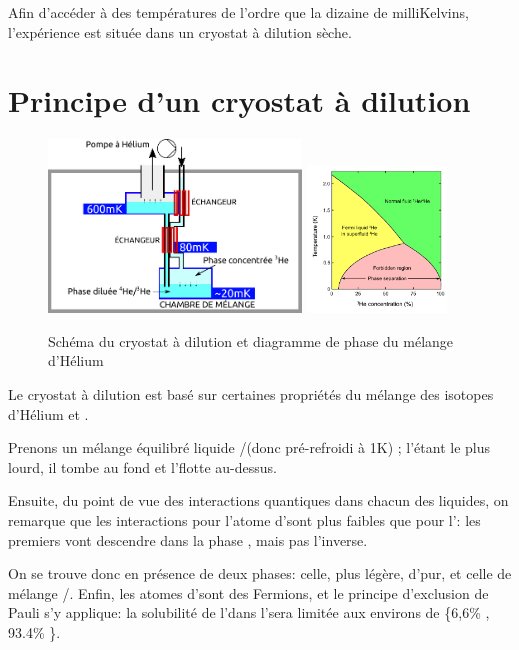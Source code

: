 Afin d'accéder à des températures de l'ordre que la dizaine de milliKelvins, l'expérience est située dans un cryostat à dilution sèche.
\section{Principe d'un cryostat à dilution}
\begin{figure}[h]
  \begin{center}
    \includegraphics[width=0.6\textwidth]{Images/Cryostat_Schema.pdf}
    \qquad
    \includegraphics[width=0.33\textwidth]{Images/Helium_phase_diagram.pdf}
    \caption{Schéma du cryostat à dilution et diagramme de phase du mélange d'Hélium}
  \end{center}
\end{figure}
Le cryostat à dilution est basé sur certaines propriétés du mélange des isotopes d'Hélium \HeT et \HeQ.
\newline

Prenons un mélange équilibré liquide \HeT/\HeQ(donc pré-refroidi à 1K) ; l'\HeQ étant le plus lourd, il tombe au fond et l'\HeT flotte au-dessus.

Ensuite, du point de vue des interactions quantiques dans chacun des liquides, on remarque que les interactions pour l'atome d'\HeT sont plus faibles que pour l'\HeQ : les premiers vont descendre dans la phase \HeQ, mais pas l'inverse.
\newline

On se trouve donc en présence de deux phases: celle, plus légère, d'\HeT pur, et celle de mélange \HeT/\HeQ.
Enfin, les atomes d'\HeT sont des Fermions, et le principe d'exclusion de Pauli s'y applique: la solubilité de l'\HeT dans l'\HeQ sera limitée aux environs de \{6,6\% \HeT, 93.4\% \HeQ\}.
\newline


